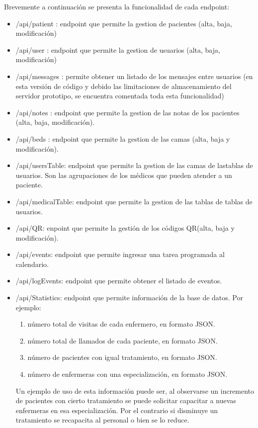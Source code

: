 Brevemente a continuación se presenta la funcionalidad de cada endpoint:
\begin{itemize}
\item /api/patient : endpoint que permite la gestion de pacientes (alta, baja, modificación)
\item /api/user : endpoint que permite la gestion de usuarios (alta, baja, modificación)
\item /api/messages : permite obtener un listado de los mensajes entre usuarios (en esta versión de código y debido las limitaciones de almacenamiento del servidor prototipo, se encuentra comentada toda esta funcionalidad)
\item /api/notes : endpoint que permite la gestion de las notas de los pacientes (alta, baja, modificación). 
\item /api/beds : endpoint que permite la gestion de las camas (alta, baja y modificación). 
\item /api/usersTable: endpoint que permite la gestion de las camas de lastablas de usuarios. Son las agrupaciones de los médicos que pueden atender a un paciente. 
\item /api/medicalTable: endpoint que permite la gestion de las tablas de tablas de usuarios.
\item /api/QR: enpoint que permite la gestión de los códigos QR(alta, baja y modificación).
\item /api/events: endpoint que permite ingresar una tarea programada al calendario.
\item /api/logEvents: endpoint que permite obtener el listado de eventos.
\item /api/Statistics: endpoint que permite información de la base de datos. Por ejemplo:
\begin{enumerate}
\item número total de visitas de cada enfermero, en formato JSON.
\item número total de llamados de cada paciente, en formato JSON.
\item número de pacientes con igual tratamiento, en formato JSON.
\item número de enfermeras con una especialización, en formato JSON.
\end{enumerate}

Un ejemplo de uso de esta información puede ser, al observarse un incremento de pacientes con cierto tratamiento se puede solicitar capacitar a nuevas enfermeras en esa especialización. Por el contrario si disminuye un tratamiento se recapacita al personal o bien se lo reduce.


\end{itemize}
